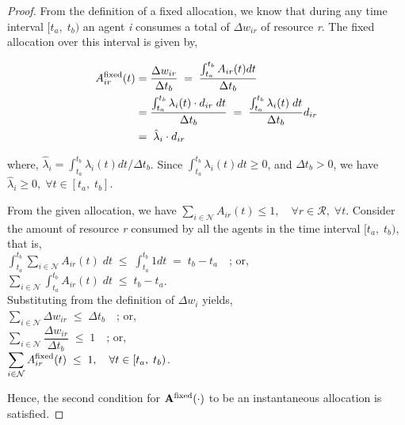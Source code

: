 \documentclass[letterpaper]{article} %
\theoremstyle{definition}
\begin{document}
\begin{proof}
From the definition of a fixed allocation, we know that during any time interval $[t_{a}, \; t_{b})$ an agent \textit{i} consumes a total of $\Delta w_{ir}$ of resource \textit{r}. The fixed allocation over this interval is given by,
\begin{linenomath}
\begin{align*}
\begin{split}
A^{\textnormal{fixed}}_{ir}(t) & = \dfrac{\Delta w_{ir}}{\Delta t_{b}} 
\; = \; \dfrac{\int_{t_{a}}^{t_{b}} A_{ir}(t) dt}{\Delta t_{b}} \; \\ & = \dfrac{\int_{t_{a}}^{t_{b}} \lambda_{i}(t) \cdot d_{ir} \; dt}{\Delta t_{b}} \; = \;
\dfrac{\int_{t_{a}}^{t_{b}} \lambda_{i}(t) \; dt}{\Delta t_{b}} d_{ir} \\ & = \; \hat{\lambda}_{i} \cdot d_{ir}
\end{split}
\end{align*}
\end{linenomath}

\noindent where, $\hat{\lambda}_{i} = \int_{t_{a}}^{t_{b}} \lambda_{i}(t)dt / \Delta t_{b}$. Since $\int_{t_{a}}^{t_{b}} \lambda_{i}(t)dt \geq 0$, and $\Delta t_{b} > 0$, we have $\hat{\lambda}_{i} \geq 0,\; \forall t \in [t_{a}, \; t_{b}]$.

\noindent From the given allocation, we have $\displaystyle \sum_{i \in \mathcal{N}} A_{ir}(t) \leq 1, \quad \forall r \in \mathcal{R}, \; \forall t$. Consider the amount of resource \textit{r} consumed by all the agents in the time interval $[t_{a}, \; t_{b})$, that is, \\
$\displaystyle \int_{t_{a}}^{t_{b}} \sum_{i \in \mathcal{N}} A_{ir}(t) \; dt \; \leq \; \displaystyle \int_{t_{a}}^{t_{b}} 1 dt \; = \; t_{b} - t_{a}\quad$; or,
\\$\displaystyle \sum_{i \in \mathcal{N}} \int_{t_{a}}^{t_{b}} A_{ir}(t) \; dt \; \leq \; t_{b} - t_{a}$.
\\[6 pt]Substituting from the definition of $\Delta w_{i}$ yields,  \\
$\displaystyle \sum_{i \in \mathcal{N}} \Delta w_{ir} \; \leq \;  \Delta t_{b} \quad$; or,
\\$\displaystyle \sum_{i \in \mathcal{N}} \dfrac{\Delta w_{ir}}{\Delta t_{b}} \; \leq \; 1 \quad$; or,
\\$\displaystyle \sum_{i \in \mathcal{N}} A^{\textnormal{fixed}}_{ir}(t) \; \leq \; 1, \quad \forall t \in [t_{a}, \; t_{b})$.

\noindent Hence, the second condition for $\mathbf{A}^{\textnormal{fixed}}(\cdot)$ to be an instantaneous allocation is satisfied.


\end{proof}
\end{document}
